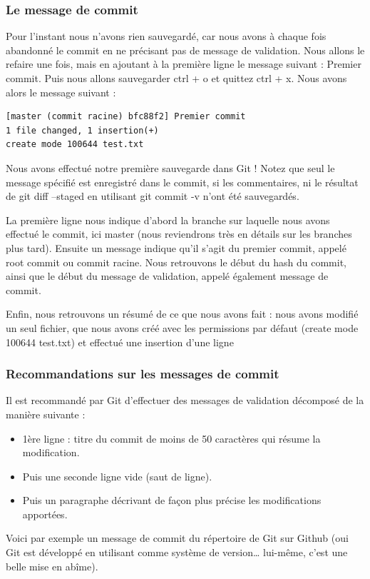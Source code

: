 \documentclass{article}
\begin{document}
\subsubsection*{Le message de commit}
Pour l'instant nous n'avons rien sauvegardé, car nous avons à chaque fois abandonné le {\color{blue}commit} en ne précisant pas de message de validation. Nous allons le refaire une fois, mais en ajoutant à la première ligne le message suivant : {\color{blue}Premier commit}. Puis nous allons sauvegarder {\color{blue}ctrl + o} et quittez {\color{blue}ctrl + x}. Nous avons alors le message suivant :
\begin{verbatim}
[master (commit racine) bfc88f2] Premier commit
1 file changed, 1 insertion(+)
create mode 100644 test.txt
\end{verbatim}

Nous avons effectué notre première sauvegarde dans {\color{blue}Git} ! Notez que seul le message spécifié est enregistré dans le commit, si les commentaires, ni le résultat de {\color{blue}git diff --staged} en utilisant {\color{blue}git commit -v} n'ont été sauvegardés.

La première ligne nous indique d'abord la branche sur laquelle nous avons effectué le {\color{blue}commit}, ici {\color{blue}master} (nous reviendrons très en détails sur les branches plus tard). Ensuite un message indique qu'il s'agit du premier commit, appelé {\color{blue}root commit} ou {\color{blue}commit} racine. Nous retrouvons le début du {\color{blue}hash} du {\color{blue}commit}, ainsi que le début du message de validation, appelé également message de {\color{blue}commit}.

Enfin, nous retrouvons un résumé de ce que nous avons fait : nous avons modifié un seul fichier, que nous avons créé avec les permissions par défaut ({\color{blue}create mode 100644 test.txt}) et effectué une insertion d'une ligne

\subsubsection*{Recommandations sur les messages de commit}
Il est recommandé par {\color{blue}Git} d'effectuer des messages de validation décomposé de la manière suivante :
\begin{itemize}
\item 1ère ligne : titre du commit de moins de 50 caractères qui résume la modification.
\item Puis une seconde ligne vide (saut de ligne).
\item Puis un paragraphe décrivant de façon plus précise les modifications apportées.
\end{itemize}
Voici par exemple un message de commit du répertoire de {\color{blue}Git} sur Github (oui {\color{blue}Git} est développé en utilisant comme système de version… lui-même, c'est une belle mise en abîme).
\end{document}
